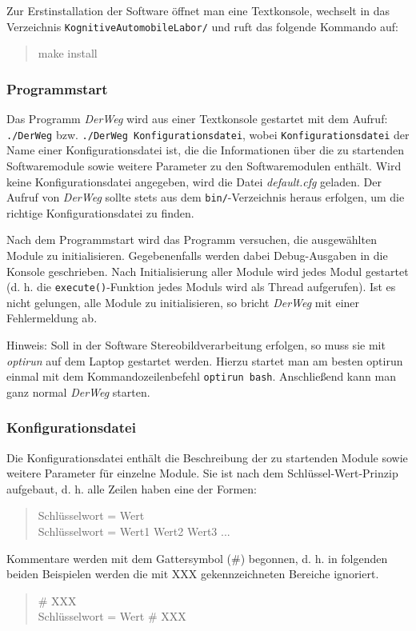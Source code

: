 \documentclass[a4paper, 11pt]{article}
\newcommand{\code}[1]{\texttt{#1}}
\newcommand{\DerWeg}{\textit{DerWeg }}  %
\begin{document}
{Zur Erstinstallation der Software öffnet man eine Textkonsole, wechselt in das Verzeichnis \texttt{KognitiveAutomobileLabor/} und ruft das folgende Kommando auf:
\begin{quote}
make install
\end{quote}


\subsubsection{Programmstart}

Das Programm \DerWeg wird aus einer Textkonsole gestartet mit dem Aufruf: \texttt{./DerWeg} bzw. \texttt{./DerWeg Konfigurationsdatei}, wobei \texttt{Konfigurationsdatei} der Name einer Konfigurationsdatei ist, die die Informationen über die zu startenden Softwaremodule sowie weitere Parameter zu den Softwaremodulen enthält. Wird keine Konfigurationsdatei angegeben, wird die Datei \textit{default.cfg} geladen. Der Aufruf von \DerWeg sollte stets aus dem \texttt{bin/}-Verzeichnis heraus erfolgen, um die richtige Konfigurationsdatei zu finden.

Nach dem Programmstart wird das Programm versuchen, die ausgewählten Module zu initialisieren. Gegebenenfalls werden dabei Debug-Ausgaben in die Konsole geschrieben. Nach Initialisierung aller Module wird jedes Modul gestartet (d. h. die \code{execute()}-Funktion jedes Moduls wird als Thread aufgerufen). Ist es nicht gelungen, alle Module zu initialisieren, so bricht \DerWeg mit einer Fehlermeldung ab.

Hinweis: Soll in der Software Stereobildverarbeitung erfolgen, so muss sie mit \textit{optirun} auf dem Laptop gestartet werden. Hierzu startet man am besten optirun einmal mit dem Kommandozeilenbefehl \texttt{optirun bash}. Anschließend kann man ganz normal \DerWeg starten.

\subsubsection{Konfigurationsdatei}
\label{sec:config}

Die Konfigurationsdatei enthält die Beschreibung der zu startenden Module sowie weitere Parameter für einzelne Module. Sie ist nach dem Schlüssel-Wert-Prinzip aufgebaut, d. h. alle Zeilen haben eine der Formen:
\begin{quote}
Schlüsselwort = Wert\\
Schlüsselwort = Wert1 Wert2 Wert3 ...
\end{quote}
Kommentare werden mit dem Gattersymbol (\#) begonnen, d. h. in folgenden beiden Beispielen werden die mit XXX gekennzeichneten Bereiche ignoriert.
\begin{quote}
\# XXX\\
Schlüsselwort = Wert \# XXX
\end{quote}

}
\end{document}

